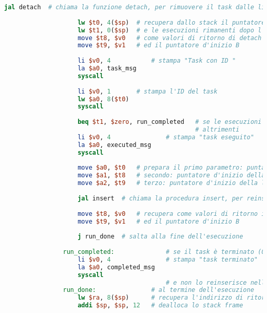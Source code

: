 \begin{center}
\begin{lstlisting}[language=mips, gobble=14, stepnumber=1]
                    jal detach  # chiama la funzione detach, per rimuovere il task dalle liste
                    
                    lw $t0, 4($sp)  # recupera dallo stack il puntatore al task da eseguire
                    lw $t1, 0($sp)  # e le esecuzioni rimanenti dopo l'esecuzione
                    move $t8, $v0   # come valori di ritorno di detach recupera il puntatore d'inizio A
                    move $t9, $v1   # ed il puntatore d'inizio B
                    
                    li $v0, 4           # stampa "Task con ID "
                    la $a0, task_msg
                    syscall
                    
                    li $v0, 1       # stampa l'ID del task
                    lw $a0, 8($t0)
                    syscall
                    
                    beq $t1, $zero, run_completed   # se le esecuzioni rimanenti sono zero, stampa "task terminato"
                                                    # altrimenti
                    li $v0, 4               # stampa "task eseguito"      
                    la $a0, executed_msg
                    syscall
                    
                    move $a0, $t0   # prepara il primo parametro: puntatore al task eseguito
                    move $a1, $t8   # secondo: puntatore d'inizio della lista A
                    move $a2, $t9   # terzo: puntatore d'inizio della lista B
                    
                    jal insert  # chiama la procedura insert, per reinserire il task eseguito al posto giusto
                    
                    move $t8, $v0   # recupera come valori di ritorno il puntatore d'inizio A
                    move $t9, $v1   # ed il puntatore d'inizio B
                    
                    j run_done  # salta alla fine dell'esecuzione
                    
                run_completed:              # se il task è terminato (0 esecuzioni rimanenti)
                    li $v0, 4               # stampa "task terminato"
                    la $a0, completed_msg
                    syscall
                                            # e non lo reinserisce nelle liste (eliminazione logica definitiva)
                run_done:               # al termine dell'esecuzione
                    lw $ra, 8($sp)      # recupera l'indirizzo di ritorno dallo stack
                    addi $sp, $sp, 12   # dealloca lo stack frame
                    

\end{lstlisting}
\end{center}
